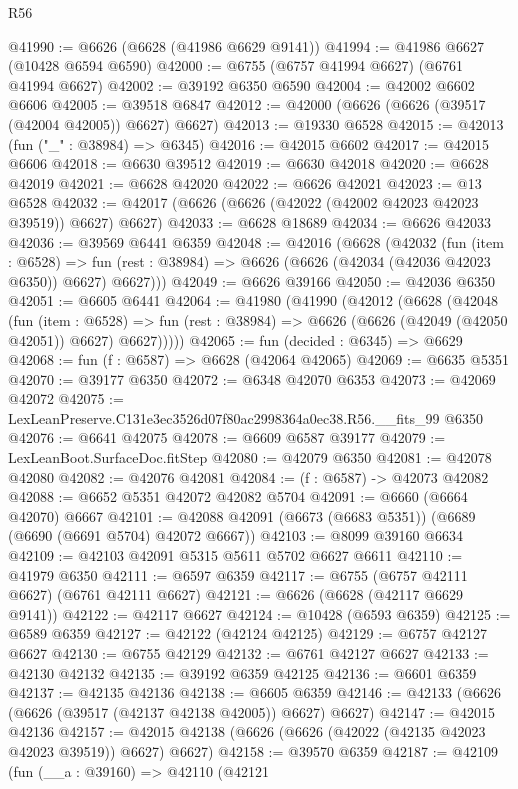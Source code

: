 \begin{lexlean}{R56}
\begin{coremodule}
@41990 := @6626 (@6628 (@41986 @6629 @9141))
@41994 := @41986 @6627 (@10428 @6594 @6590)
@42000 := @6755 (@6757 @41994 @6627) (@6761 @41994 @6627)
@42002 := @39192 @6350 @6590
@42004 := @42002 @6602 @6606
@42005 := @39518 @6847
@42012 := @42000 (@6626 (@6626 (@39517 (@42004 @42005)) @6627) @6627)
@42013 := @19330 @6528
@42015 := @42013 (fun ("_" : @38984) => @6345)
@42016 := @42015 @6602
@42017 := @42015 @6606
@42018 := @6630 @39512
@42019 := @6630 @42018
@42020 := @6628 @42019
@42021 := @6628 @42020
@42022 := @6626 @42021
@42023 := @13 @6528
@42032 := @42017 (@6626 (@6626 (@42022 (@42002 @42023 @42023 @39519)) @6627) @6627)
@42033 := @6628 @18689
@42034 := @6626 @42033
@42036 := @39569 @6441 @6359
@42048 := @42016
    (@6628
      (@42032
        (fun (item : @6528) =>
        fun (rest : @38984) => @6626 (@6626 (@42034 (@42036 @42023 @6350)) @6627) @6627)))
@42049 := @6626 @39166
@42050 := @42036 @6350
@42051 := @6605 @6441
@42064 := @41980
    (@41990
      (@42012
        (@6628
          (@42048
            (fun (item : @6528) =>
            fun (rest : @38984) => @6626 (@6626 (@42049 (@42050 @42051)) @6627) @6627)))))
@42065 := fun (decided : @6345) => @6629
@42068 := fun (f : @6587) => @6628 (@42064 @42065)
@42069 := @6635 @5351
@42070 := @39177 @6350
@42072 := @6348 @42070 @6353
@42073 := @42069 @42072
@42075 := LexLeanPreserve.C131e3ec3526d07f80ac2998364a0ec38.R56.__fits_99 @6350
@42076 := @6641 @42075
@42078 := @6609 @6587 @39177
@42079 := LexLeanBoot.SurfaceDoc.fitStep
@42080 := @42079 @6350
@42081 := @42078 @42080
@42082 := @42076 @42081
@42084 := (f : @6587) -> @42073 @42082
@42088 := @6652 @5351 @42072 @42082 @5704
@42091 := @6660 (@6664 @42070) @6667
@42101 := @42088 @42091 (@6673 (@6683 @5351)) (@6689 (@6690 (@6691 @5704) @42072 @6667))
@42103 := @8099 @39160 @6634
@42109 := @42103 @42091 @5315 @5611 @5702 @6627 @6611
@42110 := @41979 @6350
@42111 := @6597 @6359
@42117 := @6755 (@6757 @42111 @6627) (@6761 @42111 @6627)
@42121 := @6626 (@6628 (@42117 @6629 @9141))
@42122 := @42117 @6627
@42124 := @10428 (@6593 @6359)
@42125 := @6589 @6359
@42127 := @42122 (@42124 @42125)
@42129 := @6757 @42127 @6627
@42130 := @6755 @42129
@42132 := @6761 @42127 @6627
@42133 := @42130 @42132
@42135 := @39192 @6359 @42125
@42136 := @6601 @6359
@42137 := @42135 @42136
@42138 := @6605 @6359
@42146 := @42133 (@6626 (@6626 (@39517 (@42137 @42138 @42005)) @6627) @6627)
@42147 := @42015 @42136
@42157 := @42015 @42138 (@6626 (@6626 (@42022 (@42135 @42023 @42023 @39519)) @6627) @6627)
@42158 := @39570 @6359
@42187 := @42109
    (fun (__a : @39160) =>
    @42110
      (@42121

\end{coremodule}
\end{lexlean}
